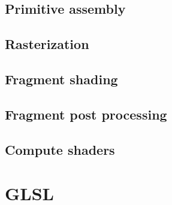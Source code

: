 \subsection{Primitive assembly}

\subsection{Rasterization}

\subsection{Fragment shading}

\subsection{Fragment post processing}

\subsection{Compute shaders}

\section{GLSL}

